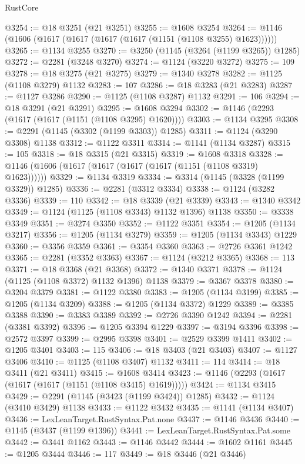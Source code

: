 \begin{lexlean}{RustCore}
\begin{coremodule}
@3254 := @18 @3251 (@21 @3251)
@3255 := @1608 @3254
@3264 := @1146 (@1606 (@1617 (@1617 (@1617 (@1617 (@1151 (@1108 @3255) @1623))))))
@3265 := @1134 @3255
@3270 := @3250 (@1145 (@3264 (@1199 @3265)) @1285)
@3272 := @2281 (@3248 @3270)
@3274 := @1124 (@3220 @3272)
@3275 := 109
@3278 := @18 @3275 (@21 @3275)
@3279 := @1340 @3278
@3282 := @1125 (@1108 @3279) @1132
@3283 := 107
@3286 := @18 @3283 (@21 @3283)
@3287 := @1127 @3286
@3290 := @1125 (@1108 @3287) @1132
@3291 := 106
@3294 := @18 @3291 (@21 @3291)
@3295 := @1608 @3294
@3302 := @1146 (@2293 (@1617 (@1617 (@1151 (@1108 @3295) @1620))))
@3303 := @1134 @3295
@3308 := @2291 (@1145 (@3302 (@1199 @3303)) @1285)
@3311 := @1124 (@3290 @3308) @1138
@3312 := @1122 @3311
@3314 := @1141 (@1134 @3287)
@3315 := 105
@3318 := @18 @3315 (@21 @3315)
@3319 := @1608 @3318
@3328 := @1146 (@1606 (@1617 (@1617 (@1617 (@1617 (@1151 (@1108 @3319) @1623))))))
@3329 := @1134 @3319
@3334 := @3314 (@1145 (@3328 (@1199 @3329)) @1285)
@3336 := @2281 (@3312 @3334)
@3338 := @1124 (@3282 @3336)
@3339 := 110
@3342 := @18 @3339 (@21 @3339)
@3343 := @1340 @3342
@3349 := @1124 (@1125 (@1108 @3343) @1132 @1396) @1138
@3350 := @3338 @3349
@3351 := @3274 @3350
@3352 := @1122 @3351
@3354 := @1205 (@1134 @3217)
@3356 := @1205 (@1134 @3279)
@3359 := @1205 (@1134 @3343) @1229
@3360 := @3356 @3359
@3361 := @3354 @3360
@3363 := @2726 @3361 @1242
@3365 := @2281 (@3352 @3363)
@3367 := @1124 (@3212 @3365)
@3368 := 113
@3371 := @18 @3368 (@21 @3368)
@3372 := @1340 @3371
@3378 := @1124 (@1125 (@1108 @3372) @1132 @1396) @1138
@3379 := @3367 @3378
@3380 := @3204 @3379
@3381 := @1122 @3380
@3383 := @1205 (@1134 @3199)
@3385 := @1205 (@1134 @3209)
@3388 := @1205 (@1134 @3372) @1229
@3389 := @3385 @3388
@3390 := @3383 @3389
@3392 := @2726 @3390 @1242
@3394 := @2281 (@3381 @3392)
@3396 := @1205 @3394 @1229
@3397 := @3194 @3396
@3398 := @2572 @3397
@3399 := @2995 @3398
@3401 := @2529 @3399 @1411
@3402 := @1205 @3401
@3403 := 115
@3406 := @18 @3403 (@21 @3403)
@3407 := @1127 @3406
@3410 := @1125 (@1108 @3407) @1132
@3411 := 114
@3414 := @18 @3411 (@21 @3411)
@3415 := @1608 @3414
@3423 := @1146 (@2293 (@1617 (@1617 (@1617 (@1151 (@1108 @3415) @1619)))))
@3424 := @1134 @3415
@3429 := @2291 (@1145 (@3423 (@1199 @3424)) @1285)
@3432 := @1124 (@3410 @3429) @1138
@3433 := @1122 @3432
@3435 := @1141 (@1134 @3407)
@3436 := LexLeanTarget.RustSyntax.Pat.none
@3437 := @1146 @3436
@3440 := @1145 (@3437 (@1199 @1396))
@3441 := LexLeanTarget.RustSyntax.Pat.some
@3442 := @3441 @1162
@3443 := @1146 @3442
@3444 := @1602 @1161
@3445 := @1205 @3444
@3446 := 117
@3449 := @18 @3446 (@21 @3446)

\end{coremodule}
\end{lexlean}
